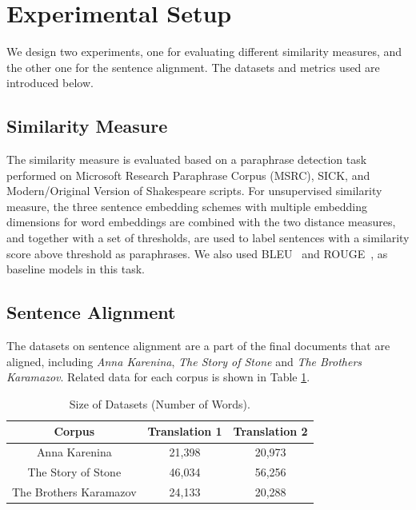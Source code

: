 \section{Experimental Setup}
\label{sec:exp}

We design two experiments, one for evaluating different similarity measures, and the other one for the sentence alignment. The datasets and metrics used are introduced below.

\subsection{Similarity Measure}

The similarity measure is evaluated based on a paraphrase detection task performed on Microsoft Research Paraphrase Corpus (MSRC), SICK, and Modern/Original Version of Shakespeare scripts. For unsupervised similarity measure, the three sentence embedding schemes with multiple embedding dimensions for word embeddings are combined with the two distance measures, and together with a set of thresholds, are used to label sentences with a similarity score above threshold as paraphrases. We also used BLEU~\cite{papineni2002bleu} and ROUGE~\cite{lin2004rouge}, as baseline models in this task.

\subsection{Sentence Alignment}

The datasets on sentence alignment are a part of the final documents that are aligned, including \emph{Anna Karenina}, \emph{The Story of Stone} and \emph{The Brothers Karamazov}. Related data for each corpus is shown in Table \ref{tb:1}.

\begin{table}[h!]\footnotesize
	\centering
	\small
	\begin{tabular}{|c|c|c|}
		\hline
		Corpus & Translation 1 & Translation 2 \\
		\hline
		Anna Karenina & 21,398 & 20,973 \\
		The Story of Stone & 46,034 & 56,256 \\
		The Brothers Karamazov & 24,133 & 20,288 \\
		\hline
	\end{tabular}
	\caption{Size of Datasets (Number of Words).}\label{tb:1}
\end{table}

